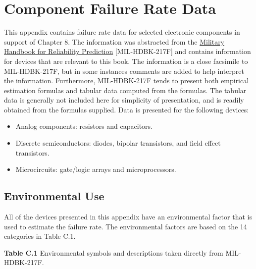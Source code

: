 \section{\texorpdfstring{Component Failure Rate Data
}{Component Failure Rate Data }}\label{component-failure-rate-data}

This appendix contains failure rate data for selected electronic
components in support of Chapter 8. The information was abstracted from
the \ul{Military Handbook for Reliability Prediction}
{[}MIL-HDBK-217F{]} and contains information for devices that are
relevant to this book. The information is a close facsimile to
MIL-HDBK-217F, but in some instances comments are added to help
interpret the information. Furthermore, MIL-HDBK-217F tends to present
both empirical estimation formulas and tabular data computed from the
formulas. The tabular data is generally not included here for simplicity
of presentation, and is readily obtained from the formulas supplied.
Data is presented for the following devices:

\begin{itemize}
\item
  Analog components: resistors and capacitors.
\item
  Discrete semiconductors: diodes, bipolar transistors, and field effect
  transistors.
\item
  Microcircuits: gate/logic arrays and microprocessors.
\end{itemize}

\subsection{Environmental Use}\label{environmental-use}

All of the devices presented in this appendix have an environmental
factor that is used to estimate the failure rate. The environmental
factors are based on the 14 categories in Table C.1.

\textbf{Table C.1} Environmental symbols and descriptions taken directly
from MIL-HDBK-217F.

